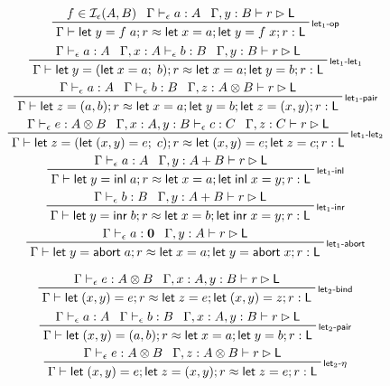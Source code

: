 \documentclass[acmsmall,screen,review]{acmart}
\newcommand{\mc}[1]{\ensuremath{\mathcal{#1}}}
\newcommand{\mb}[1]{\ensuremath{\mathbf{#1}}}
\newcommand{\ms}[1]{\ensuremath{\mathsf{#1}}}
\newcommand{\linl}[1]{\ms{inl}\;{#1}}
\newcommand{\linr}[1]{\ms{inr}\;{#1}}
\newcommand{\labort}[1]{\ms{abort}\;{#1}}
\newcommand{\letexpr}[3]{\ensuremath{\ms{let}\;#1 = #2;\;#3}}
\newcommand{\letstmt}[3]{\ensuremath{\ms{let}\;#1 = #2; #3}}
\newcommand{\bhyp}[2]{#1 : #2}
\newcommand{\rle}[1]{{\scriptsize\textsf{#1}}}
\newcommand{\hasty}[4]{#1 \vdash_{#2} #3: {#4}}
\newcommand{\haslb}[3]{#1 \vdash #2 \rhd #3}
\newcommand{\isop}[4]{#1 \in \mc{I}_{#4}(#2, #3)}
\newcommand{\teqv}{\approx}
\newcommand{\lbeq}[4]{#1 \vdash #2 \teqv #3 : {#4}}
\begin{document}
\begin{gather*}
  \prftree[r]{\rle{let$_1$-op}}
    {\isop{f}{A}{B}{\epsilon}}
    {\hasty{\Gamma}{\epsilon}{a}{A}}
    {\haslb{\Gamma, \bhyp{y}{B}}{r}{\ms{L}}}
    {\lbeq{\Gamma}{\letstmt{y}{f\;a}{r}}{\letstmt{x}{a}{\letstmt{y}{f\;x}{r}}}{\ms{L}}}
  \\
  \prftree[r]{\rle{let$_{1}$-let$_1$}}
    {\hasty{\Gamma}{\epsilon}{a}{A}}
    {\hasty{\Gamma, \bhyp{x}{A}}{\epsilon}{b}{B}}
    {\haslb{\Gamma, \bhyp{y}{B}}{r}{\ms{L}}}
    {\lbeq{\Gamma}{\letstmt{y}{(\letexpr{x}{a}{b})}{r}}{\letstmt{x}{a}{\letstmt{y}{b}{r}}}{\ms{L}}}
  \\
  \prftree[r]{\rle{let$_1$-pair}}
    {\hasty{\Gamma}{\epsilon}{a}{A}}
    {\hasty{\Gamma}{\epsilon}{b}{B}}
    {\haslb{\Gamma, \bhyp{z}{A \otimes B}}{r}{\ms{L}}}
    {\lbeq{\Gamma}
      {\letstmt{z}{(a, b)}{r}}
      {\letstmt{x}{a}{\letstmt{y}{b}{\letstmt{z}{(x, y)}{r}}}}
      {\ms{L}}}
  \\
  \prftree[r]{\rle{let$_{1}$-let$_2$}}
    {\hasty{\Gamma}{\epsilon}{e}{A \otimes B}}
    {\hasty{\Gamma, \bhyp{x}{A}, \bhyp{y}{B}}{\epsilon}{c}{C}}
    {\haslb{\Gamma, \bhyp{z}{C}}{r}{\ms{L}}}
    {\lbeq{\Gamma}
      {\letstmt{z}{(\letexpr{(x, y)}{e}{c})}{r}}
      {\letstmt{(x, y)}{e}{\letstmt{z}{c}{r}}}
      {\ms{L}}}
  \\
  \prftree[r]{\rle{let$_1$-inl}}
    {\hasty{\Gamma}{\epsilon}{a}{A}}
    {\haslb{\Gamma, \bhyp{y}{A + B}}{r}{\ms{L}}}
    {\lbeq{\Gamma}{\letstmt{y}{\linl{a}}{r}}{\letstmt{x}{a}{\letstmt{\linl{x}}{y}{r}}}{\ms{L}}}
  \\
  \prftree[r]{\rle{let$_1$-inr}}
    {\hasty{\Gamma}{\epsilon}{b}{B}}
    {\haslb{\Gamma, \bhyp{y}{A + B}}{r}{\ms{L}}}
    {\lbeq{\Gamma}{\letstmt{y}{\linr{b}}{r}}{\letstmt{x}{b}{\letstmt{\linr{x}}{y}{r}}}{\ms{L}}}
  \\
  \prftree[r]{\rle{let$_1$-abort}}
    {\hasty{\Gamma}{\epsilon}{a}{\mb{0}}}
    {\haslb{\Gamma, \bhyp{y}{A}}{r}{\ms{L}}}
    {\lbeq{\Gamma}{\letstmt{y}{\labort{a}}{r}}{\letstmt{x}{a}{\letstmt{y}{\labort{x}}{r}}}{\ms{L}}}
\end{gather*}

\begin{gather*}
  \prftree[r]{\rle{let$_2$-bind}}
    {\hasty{\Gamma}{\epsilon}{e}{A \otimes B}}
    {\haslb{\Gamma, \bhyp{x}{A}, \bhyp{y}{B}}{r}{\ms{L}}}
    {\lbeq{\Gamma}{\letstmt{(x, y)}{e}{r}}{\letstmt{z}{e}{\letstmt{(x, y)}{z}{r}}}{\ms{L}}}
  \\
  \prftree[r]{\rle{let$_2$-pair}}
    {\hasty{\Gamma}{\epsilon}{a}{A}}
    {\hasty{\Gamma}{\epsilon}{b}{B}}
    {\haslb{\Gamma, \bhyp{x}{A}, \bhyp{y}{B}}{r}{\ms{L}}}
    {\lbeq{\Gamma}{\letstmt{(x, y)}{(a, b)}{r}}{\letstmt{x}{a}{\letstmt{y}{b}{r}}}{\ms{L}}}
  \\
  \prftree[r]{\rle{let$_2$-$\eta$}}
    {\hasty{\Gamma}{\epsilon}{e}{A \otimes B}}
    {\haslb{\Gamma, \bhyp{z}{A \otimes B}}{r}{\ms{L}}}
    {\lbeq{\Gamma}{\letstmt{(x, y)}{e}{\letstmt{z}{(x, y)}{r}}}{\letstmt{z}{e}{r}}{\ms{L}}}
\end{gather*}
\end{document}
